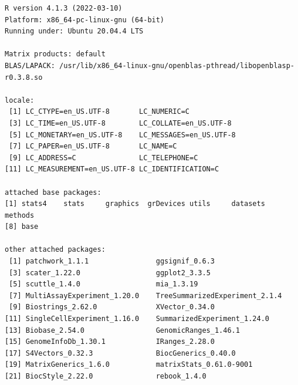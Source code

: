 \documentclass[
]{book}
\begin{document}
\begin{verbatim}
R version 4.1.3 (2022-03-10)
Platform: x86_64-pc-linux-gnu (64-bit)
Running under: Ubuntu 20.04.4 LTS

Matrix products: default
BLAS/LAPACK: /usr/lib/x86_64-linux-gnu/openblas-pthread/libopenblasp-r0.3.8.so

locale:
 [1] LC_CTYPE=en_US.UTF-8       LC_NUMERIC=C              
 [3] LC_TIME=en_US.UTF-8        LC_COLLATE=en_US.UTF-8    
 [5] LC_MONETARY=en_US.UTF-8    LC_MESSAGES=en_US.UTF-8   
 [7] LC_PAPER=en_US.UTF-8       LC_NAME=C                 
 [9] LC_ADDRESS=C               LC_TELEPHONE=C            
[11] LC_MEASUREMENT=en_US.UTF-8 LC_IDENTIFICATION=C       

attached base packages:
[1] stats4    stats     graphics  grDevices utils     datasets  methods  
[8] base     

other attached packages:
 [1] patchwork_1.1.1                ggsignif_0.6.3                
 [3] scater_1.22.0                  ggplot2_3.3.5                 
 [5] scuttle_1.4.0                  mia_1.3.19                    
 [7] MultiAssayExperiment_1.20.0    TreeSummarizedExperiment_2.1.4
 [9] Biostrings_2.62.0              XVector_0.34.0                
[11] SingleCellExperiment_1.16.0    SummarizedExperiment_1.24.0   
[13] Biobase_2.54.0                 GenomicRanges_1.46.1          
[15] GenomeInfoDb_1.30.1            IRanges_2.28.0                
[17] S4Vectors_0.32.3               BiocGenerics_0.40.0           
[19] MatrixGenerics_1.6.0           matrixStats_0.61.0-9001       
[21] BiocStyle_2.22.0               rebook_1.4.0                  


\end{verbatim}
\end{document}
